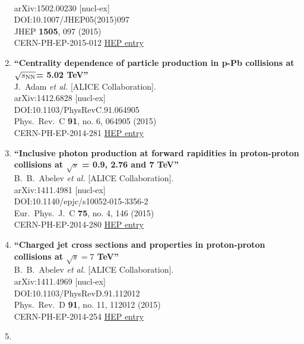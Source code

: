 \begin{enumerate}
  \\{}arXiv:1502.00230 [nucl-ex]
  \\{}DOI:10.1007/JHEP05(2015)097
  \\{}JHEP {\bf 1505}, 097 (2015)
  \\{}CERN-PH-EP-2015-012
\href{http://inspirehep.net/record/1342496}{HEP entry}
\item%
{\bf ``Centrality dependence of particle production in p-Pb collisions at $\sqrt{s_{\rm NN} }$= 5.02 TeV''}
  \\{}J.~Adam {\it et al.} [ALICE Collaboration].
  \\{}arXiv:1412.6828 [nucl-ex]
  \\{}DOI:10.1103/PhysRevC.91.064905
  \\{}Phys.\ Rev.\ C {\bf 91}, no. 6, 064905 (2015)
  \\{}CERN-PH-EP-2014-281
\href{http://inspirehep.net/record/1335350}{HEP entry}
\item%
{\bf ``Inclusive photon production at forward rapidities in proton-proton collisions at $\sqrt{s}$ = 0.9, 2.76 and 7 TeV''}
  \\{}B.~B.~Abelev {\it et al.} [ALICE Collaboration].
  \\{}arXiv:1411.4981 [nucl-ex]
  \\{}DOI:10.1140/epjc/s10052-015-3356-2
  \\{}Eur.\ Phys.\ J.\ C {\bf 75}, no. 4, 146 (2015)
  \\{}CERN-PH-EP-2014-280
\href{http://inspirehep.net/record/1328669}{HEP entry}
\item%
{\bf ``Charged jet cross sections and properties in proton-proton collisions at $\sqrt{s}=7$ TeV''}
  \\{}B.~B.~Abelev {\it et al.} [ALICE Collaboration].
  \\{}arXiv:1411.4969 [nucl-ex]
  \\{}DOI:10.1103/PhysRevD.91.112012
  \\{}Phys.\ Rev.\ D {\bf 91}, no. 11, 112012 (2015)
  \\{}CERN-PH-EP-2014-254
\href{http://inspirehep.net/record/1328629}{HEP entry}
\item%

\end{enumerate}
